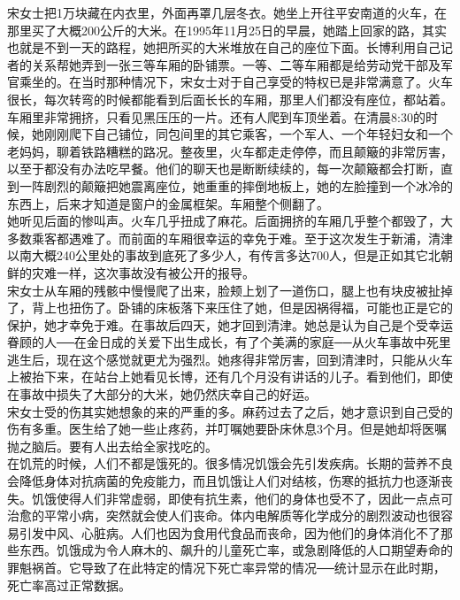 宋女士把1万块藏在内衣里，外面再罩几层冬衣。她坐上开往平安南道的火车，在那里买了大概200公斤的大米。在1995年11月25日的早晨，她踏上回家的路，其实也就是不到一天的路程，她把所买的大米堆放在自己的座位下面。长博利用自己记者的关系帮她弄到一张三等车厢的卧铺票。一等、二等车厢都是给劳动党干部及军官乘坐的。在当时那种情况下，宋女士对于自己享受的特权已是非常满意了。火车很长，每次转弯的时候都能看到后面长长的车厢，那里人们都没有座位，都站着。车厢里非常拥挤，只看见黑压压的一片。还有人爬到车顶坐着。在清晨8:30的时候，她刚刚爬下自己铺位，同包间里的其它乘客，一个军人、一个年轻妇女和一个老妈妈，聊着铁路糟糕的路况。整夜里，火车都走走停停，而且颠簸的非常厉害，以至于都没有办法吃早餐。他们的聊天也是断断续续的，每一次颠簸都会打断，直到一阵剧烈的颠簸把她震离座位，她重重的摔倒地板上，她的左脸撞到一个冰冷的东西上，后来才知道是窗户的金属框架。车厢整个侧翻了。\\

她听见后面的惨叫声。火车几乎扭成了麻花。后面拥挤的车厢几乎整个都毁了，大多数乘客都遇难了。而前面的车厢很幸运的幸免于难。至于这次发生于新浦，清津以南大概240公里处的事故到底死了多少人，有传言多达700人，但是正如其它北朝鲜的灾难一样，这次事故没有被公开的报导。\\

宋女士从车厢的残骸中慢慢爬了出来，脸颊上划了一道伤口，腿上也有块皮被扯掉了，背上也扭伤了。卧铺的床板落下来压住了她，但是因祸得福，可能也正是它的保护，她才幸免于难。在事故后四天，她才回到清津。她总是认为自己是个受幸运眷顾的人──在金日成的关爱下出生成长，有了个美满的家庭──从火车事故中死里逃生后，现在这个感觉就更尤为强烈。她疼得非常厉害，回到清津时，只能从火车上被抬下来，在站台上她看见长博，还有几个月没有讲话的儿子。看到他们，即使在事故中损失了大部分的大米，她仍然庆幸自己的好运。\\

宋女士受的伤其实她想象的来的严重的多。麻药过去了之后，她才意识到自己受的伤有多重。医生给了她一些止疼药，并叮嘱她要卧床休息3个月。但是她却将医嘱抛之脑后。要有人出去给全家找吃的。\\

在饥荒的时候，人们不都是饿死的。很多情况饥饿会先引发疾病。长期的营养不良会降低身体对抗病菌的免疫能力，而且饥饿让人们对结核，伤寒的抵抗力也逐渐丧失。饥饿使得人们非常虚弱，即使有抗生素，他们的身体也受不了，因此一点点可治愈的平常小病，突然就会使人们丧命。体内电解质等化学成分的剧烈波动也很容易引发中风、心脏病。人们也因为食用代食品而丧命，因为他们的身体消化不了那些东西。饥饿成为令人麻木的、飙升的儿童死亡率，或急剧降低的人口期望寿命的罪魁祸首。它导致了在此特定的情况下死亡率异常的情况──统计显示在此时期，死亡率高过正常数据。\\


